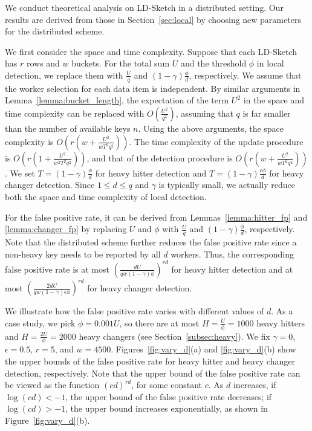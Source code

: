 We conduct theoretical analysis on LD-Sketch in a distributed setting.  Our
results are derived from those in Section~\ref{sec:local} by choosing new
parameters for the distributed scheme.

We first consider the space and time complexity. Suppose that each LD-Sketch
has $r$ rows and $w$ buckets.  For the total sum $U$ and the threshold $\phi$
in local detection, we replace them with $\frac{U}{q}$ and
$(1-\gamma)\frac{\phi}{d}$, respectively.  We assume that the worker selection
for each data item is independent.  By similar arguments in
Lemma~\ref{lemma:bucket_length}, the expectation of the term $U^2$ in the
space and time complexity can be replaced with $O(\frac{U^2}{q^2})$, assuming
that $q$ is far smaller than the number of available keys $n$.  Using the
above arguments, the space complexity is $O(r(w+\frac{U^2}{wT^2q^2}))$.  The
time complexity of the update procedure is $O(r(1+\frac{U^2}{w^2T^2q^2}))$, and
that of the detection procedure is $O(r(w+\frac{U^2}{wT^2q^2}))$.  We
set $T=(1-\gamma)\frac{\phi}{d}$ for heavy hitter detection and
$T=(1-\gamma)\frac{\epsilon\phi}{d}$ for heavy changer detection.  Since $1\le
d \le q$ and $\gamma$ is typically small, we actually reduce both the space
and time complexity of local detection.

For the false positive rate, it can be derived from
Lemmas~\ref{lemma:hitter_fp} and \ref{lemma:changer_fp} by replacing $U$ and
$\phi$ with $\frac{U}{q}$ and $(1-\gamma)\frac{\phi}{d}$, respectively.
Note that the distributed scheme further reduces the false positive rate
since a non-heavy key needs to be reported by all $d$ workers.  Thus, the
corresponding false positive rate is at most 
$(\frac{dU}{qw(1-\gamma)\phi})^{rd}$ for heavy hitter detection and at most
$(\frac{2dU}{qw(1-\gamma)\epsilon\phi})^{rd}$ for heavy changer detection.  

We illustrate how the false positive rate varies with different values of $d$. 
As a case study, we pick $\phi=0.001U$, so there are at most $H=\frac{U}{\phi}
= 1000$ heavy hitters and $H=\frac{2U}{\phi} = 2000$ heavy changers (see
Section~\ref{subsec:heavy}).  We fix $\gamma=0$, $\epsilon=0.5$, $r=5$, and 
$w = 4500$.  Figures~\ref{fig:vary_d}(a) and \ref{fig:vary_d}(b) show the
upper bounds of the false positive rate for heavy hitter and heavy changer
detection, respectively.  Note that the upper bound of the false positive rate
can be viewed as the function $(cd)^{rd}$, for some constant $c$.  As $d$
increases, if $\log(cd) < -1$, the upper bound of the false positive rate
decreases; if $\log(cd) > -1$, the upper bound increases exponentially, as
shown in Figure~\ref{fig:vary_d}(b). 

